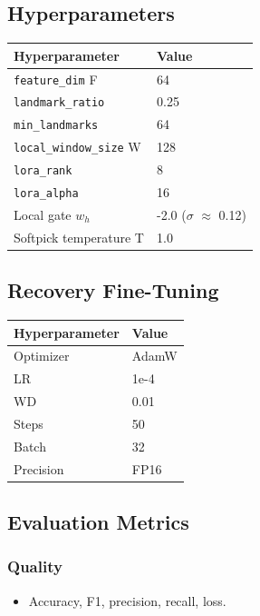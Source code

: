 \subsection{Hyperparameters}

\begin{table}[H]
\centering
\small
\begin{tabular}{ll}
\toprule
\textbf{Hyperparameter} & \textbf{Value} \\
\midrule
\texttt{feature\_dim} F & 64 \\
\texttt{landmark\_ratio} & 0.25 \\
\texttt{min\_landmarks} & 64 \\
\texttt{local\_window\_size} W & 128 \\
\texttt{lora\_rank} & 8 \\
\texttt{lora\_alpha} & 16 \\
Local gate $w_h$ & -2.0 ($\sigma$ $\approx$ 0.12) \\
Softpick temperature T & 1.0 \\
\bottomrule
\end{tabular}
\end{table}

\subsection{Recovery Fine-Tuning}

\begin{table}[H]
\centering
\small
\begin{tabular}{ll}
\toprule
\textbf{Hyperparameter} & \textbf{Value} \\
\midrule
Optimizer & AdamW \\
LR & 1e-4 \\
WD & 0.01 \\
Steps & 50 \\
Batch & 32 \\
Precision & FP16 \\
\bottomrule
\end{tabular}
\end{table}

\subsection{Evaluation Metrics}

\subsubsection{Quality}
\begin{itemize}
\item Accuracy, F1, precision, recall, loss.

\end{itemize}
